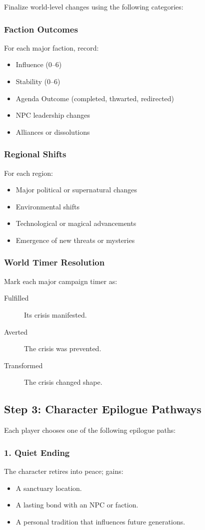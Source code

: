 \documentclass[11pt]{article}
\begin{document}
Finalize world-level changes using the following categories:

\subsubsection{Faction Outcomes}
For each major faction, record:
\begin{itemize}
    \item Influence (0--6)
    \item Stability (0--6)
    \item Agenda Outcome (completed, thwarted, redirected)
    \item NPC leadership changes
    \item Alliances or dissolutions
\end{itemize}

\subsubsection{Regional Shifts}
For each region:
\begin{itemize}
    \item Major political or supernatural changes
    \item Environmental shifts
    \item Technological or magical advancements
    \item Emergence of new threats or mysteries
\end{itemize}

\subsubsection{World Timer Resolution}
Mark each major campaign timer as:
\begin{description}
    \item[Fulfilled] Its crisis manifested.
    \item[Averted] The crisis was prevented.
    \item[Transformed] The crisis changed shape.
\end{description}

\subsection{Step 3: Character Epilogue Pathways}

Each player chooses one of the following epilogue paths:

\subsubsection{1. Quiet Ending}
The character retires into peace; gains:
\begin{itemize}
    \item A sanctuary location.
    \item A lasting bond with an NPC or faction.
    \item A personal tradition that influences future generations.
\end{itemize}
\end{document}
